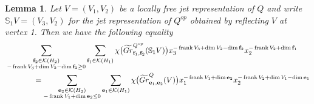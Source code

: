 \documentclass{amsart}
\numberwithin{equation}{section}
\newtheorem{lemma}[theorem]{Lemma}
\theoremstyle{definition}
\def\SS{\mathbb{S}}
\def\bfe{\mathbf{e}}
\def\bff{\mathbf{f}}
\def\cK{\mathcal{K}}
\def\dim{\operatorname{dim}}
\def\frank{\operatorname{frank}}
\begin{document}
\begin{lemma}\label{le:reflection recursion 2}
  Let $V=(V_1,V_2)$ be a locally free jet representation of $Q$ and write $\SS_1V=(V_3,V_2)$ for the jet representation of $Q^{op}$ obtained by reflecting $V$ at vertex 1.  Then we have the following equality
  \begin{align}\label{eq:reflection recursion 2}
    &\sum\limits_{\substack{\bff_2\in\cK(H_2)\\-\frank V_3+\dim V_2-\dim\bff_2\ge0}}\sum\limits_{\bff_1\in\cK(H_1)}\chi\big(\widetilde{Gr}^{Q^{op}}_{\bff_1,\bff_2}(\SS_1 V)\big)x_3^{-\frank V_3+\dim V_2-\dim\bff_2}x_2^{-\frank V_2+\dim\bff_1}\\
    \nonumber
    &\hspace{0.5in}=\sum\limits_{\substack{\bfe_2\in\cK(H_2)\\-\frank V_1+\dim\bfe_2\le0}}\sum\limits_{\bfe_1\in\cK(H_1)}\chi\big(\widetilde{Gr}^Q_{\bfe_1,\bfe_2}(V)\big)x_1^{-\frank V_1+\dim\bfe_2}x_2^{-\frank V_2+\dim V_1-\dim\bfe_1}
  \end{align}
\end{lemma}
\end{document}
